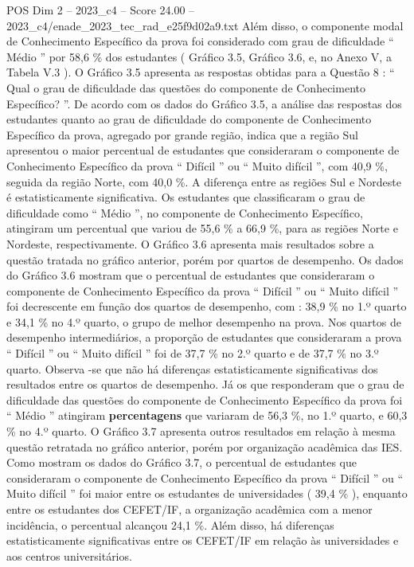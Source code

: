 \begin{textsample}{POS Dim 2 – 2023\_c4 – Score 24.00 – 2023\_c4/enade\_2023\_tec\_rad\_e25f9d02a9.txt}
Além disso, o componente modal de Conhecimento Específico da prova foi considerado com grau de dificuldade “ Médio ” por 58,6 \% dos estudantes ( Gráfico 3.5, Gráfico 3.6, e, no Anexo V, a Tabela V.3 ).
O Gráfico 3.5 apresenta as respostas obtidas para a Questão 8 : “ Qual o grau de dificuldade das questões do componente de Conhecimento Específico? ”.
De acordo com os dados do Gráfico 3.5, a análise das respostas dos estudantes quanto ao grau de dificuldade do componente de Conhecimento Específico da prova, agregado por grande região, indica que a região Sul apresentou o maior percentual de estudantes que consideraram o componente de Conhecimento Específico da prova “ Difícil ” ou “ Muito difícil ”, com 40,9 \%, seguida da região Norte, com 40,0 \%.
A diferença entre as regiões Sul e Nordeste é estatisticamente significativa.
Os estudantes que classificaram o grau de dificuldade como “ Médio ”, no componente de Conhecimento Específico, atingiram um percentual que variou de 55,6 \% a 66,9 \%, para as regiões Norte e Nordeste, respectivamente.
O Gráfico 3.6 apresenta mais resultados sobre a questão tratada no gráfico anterior, porém por quartos de desempenho.
Os dados do Gráfico 3.6 mostram que o percentual de estudantes que consideraram o componente de Conhecimento Específico da prova “ Difícil ” ou “ Muito difícil ” foi decrescente em função dos quartos de desempenho, com : 38,9 \% no 1.º quarto e 34,1 \% no 4.º quarto, o grupo de melhor desempenho na prova.
Nos quartos de desempenho intermediários, a proporção de estudantes que consideraram a prova “ Difícil ” ou “ Muito difícil ” foi de 37,7 \% no 2.º quarto e de 37,7 \% no 3.º quarto.
Observa -se que não há diferenças estatisticamente significativas dos resultados entre os quartos de desempenho.
Já os que responderam que o grau de dificuldade das questões do componente de Conhecimento Específico da prova foi “ Médio ” atingiram \textbf{percentagens} que variaram de 56,3 \%, no 1.º quarto, e 60,3 \% no 4.º quarto.
O Gráfico 3.7 apresenta outros resultados em relação à mesma questão retratada no gráfico anterior, porém por organização acadêmica das IES.
Como mostram os dados do Gráfico 3.7, o percentual de estudantes que consideraram o componente de Conhecimento Específico da prova “ Difícil ” ou “ Muito difícil ” foi maior entre os estudantes de universidades ( 39,4 \% ), enquanto entre os estudantes dos CEFET/IF, a organização acadêmica com a menor incidência, o percentual alcançou 24,1 \%.
Além disso, há diferenças estatisticamente significativas entre os CEFET/IF em relação às universidades e aos centros universitários.

\end{textsample}
